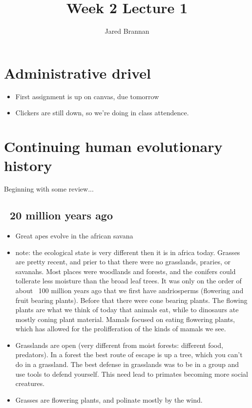 \documentclass{article}
\title{Week 2 Lecture 1}
\author{Jared Brannan }
\theoremstyle{definition}
\begin{document}
\maketitle
\section{Administrative drivel}
\begin{itemize}
	\item First assignment is up on canvas, due tomorrow
	\item Clickers are still down, so we're doing in class attendence.
\end{itemize}

\section{Continuing human evolutionary history}

Beginning with some review...
\subsection{~20 million years ago}
\begin{itemize}
	\item Great apes evolve in the african savana
	\item note: the ecological state is very different then it is in africa today. Grasses are pretty recent, and prier to that there were no grasslands, praries, or savanahs. Most places were woodlands and forests, and the conifers could tollerate less moisture than the broad leaf trees. It was only on the order of about ~100 million years ago that we first have andriosperms (flowering and fruit bearing plants). Before that there were cone bearing plants. The flowing plants are what we think of today that animals eat, while to dinosaurs ate mostly coning plant material. Mamals focused on eating flowering plants, which has allowed for the prolifferation of the kinds of mamals we see.
	\item Grasslands are open (very different from moist forests: different food, predators). In a forest the best route of escape is up a tree, which you can't do in a grassland. The best defense in grasslands was to be in a group and use tools to defend yourself. This need lead to primates becoming more social creatures.
	\item Grasses are flowering plants, and polinate mostly by the wind.
\end{itemize}
\end{document}
